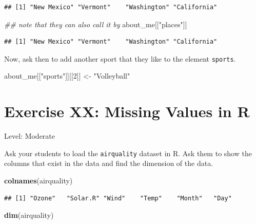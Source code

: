 \documentclass[]{book}
\newenvironment{Shaded}{\begin{snugshade}}{\end{snugshade}}
\newcommand{\CommentTok}[1]{\textcolor[rgb]{0.56,0.35,0.01}{\textit{#1}}}
\newcommand{\DecValTok}[1]{\textcolor[rgb]{0.00,0.00,0.81}{#1}}
\newcommand{\KeywordTok}[1]{\textcolor[rgb]{0.13,0.29,0.53}{\textbf{#1}}}
\newcommand{\NormalTok}[1]{#1}
\newcommand{\StringTok}[1]{\textcolor[rgb]{0.31,0.60,0.02}{#1}}
\begin{document}
\begin{verbatim}
## [1] "New Mexico" "Vermont"    "Washington" "California"
\end{verbatim}

\begin{Shaded}
\begin{Highlighting}[]
\CommentTok{## note that they can also call it by }
\NormalTok{about_me[[}\StringTok{"places"}\NormalTok{]]}
\end{Highlighting}
\end{Shaded}

\begin{verbatim}
## [1] "New Mexico" "Vermont"    "Washington" "California"
\end{verbatim}

Now, ask then to add another sport that they like to the element \texttt{sports}.

\begin{Shaded}
\begin{Highlighting}[]
\NormalTok{about_me[[}\StringTok{"sports"}\NormalTok{]][[}\DecValTok{2}\NormalTok{]] <-}\StringTok{ "Volleyball"}
\end{Highlighting}
\end{Shaded}

\hypertarget{exercise-xx-missing-values-in-r}{%
\section*{Exercise XX: Missing Values in R}\label{exercise-xx-missing-values-in-r}}

Level: Moderate

Ask your students to load the \texttt{airquality} dataset in R. Ask them to show the columns that exist in the data and find the dimension of the data.

\begin{Shaded}
\begin{Highlighting}[]
\KeywordTok{colnames}\NormalTok{(airquality)}
\end{Highlighting}
\end{Shaded}

\begin{verbatim}
## [1] "Ozone"   "Solar.R" "Wind"    "Temp"    "Month"   "Day"
\end{verbatim}

\begin{Shaded}
\begin{Highlighting}[]
\KeywordTok{dim}\NormalTok{(airquality)}
\end{Highlighting}
\end{Shaded}
\end{document}
